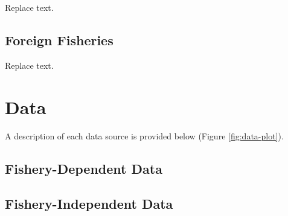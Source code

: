 \documentclass[11pt,
  english,
  a4paper,
]{article}
\begin{document}

Replace text.

\leavevmode\tagmcend\tagstructend\par


\hypertarget{foreign-fisheries}{%
\subsection{Foreign Fisheries}\label{foreign-fisheries}}

\leavevmode\tagmcend\tagstructend


Replace text.

\leavevmode\tagmcend\tagstructend\par


\hypertarget{data}{%
\section{Data}\label{data}}

\leavevmode\tagmcend\tagstructend


A description of each data source is provided below (Figure \ref{fig:data-plot}).

\leavevmode\tagmcend\tagstructend\par


\hypertarget{fishery-dependent-data}{%
\subsection{Fishery-Dependent Data}\label{fishery-dependent-data}}

\leavevmode\tagmcend\tagstructend


\hypertarget{fishery-independent-data}{%
\subsection{Fishery-Independent Data}\label{fishery-independent-data}}

\leavevmode\tagmcend\tagstructend
\end{document}
